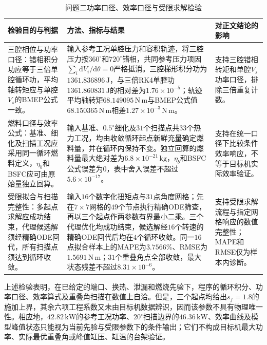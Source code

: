 \documentclass[withoutpreface,bwprint]{cumcmthesis}
\begin{document}
\begin{table}[H]
\centering
\small
\caption{问题二功率口径、效率口径与受限求解检验}
\label{tab:q2-consistency-verification}
\begin{tabular}{p{}p{}p{}}
\toprule
检验目的与判据 & 方法、指标与结果 & 对正文结论的影响\\
\midrule
三腔相位与功率口径：错相积分功应等于三倍单腔循环功，平均轴转矩应与单腔$V_s$的BMEP公式一致。 & 输入参考工况单腔压力和容积轨迹，将三腔压力按$360^\circ$和$720^\circ$错相，共同参考压力项因$\sum_i\mathrm dV_i/\mathrm d\theta=0$严格抵消。三腔梯形积分功为$1361.836896\,\mathrm{J}$，与三倍RK4单腔功$1361.860831\,\mathrm{J}$的相对差为$1.76\times10^{-5}$；轨迹平均轴转矩$68.149095\,\mathrm{N\,m}$与BMEP公式值$68.150365\,\mathrm{N\,m}$相差$1.27\times10^{-3}\,\mathrm{N\,m}$。 & 支持三腔错相转矩和单腔$V_s$功率口径，排除三倍重复计数。\\
燃料口径与效率公式：基准、细化及扫描工况应采用同一循环燃料定义，$\eta_b$和BSFC应可由原始量独立回算。 & 输入基准、$0.5^\circ$细化及$31$个扫描点共$33$个热力工况，均由收敛循环起点新鲜充量确定燃料量，并在循环内保持不变。独立回算的燃料量最大绝对差为$6.8\times10^{-21}\,\mathrm{kg}$，$\eta_b$和BSFC公式误差为$0$，表中舍入误差不超过$5.6\times10^{-17}$。 & 支持在统一口径下比较条件效率响应，不等于目标机实际效率验证。\\
受限拟合与扫描完整性：多起点求解应成功结束，代理候选解须经精确ODE回代，所有扫描点须达到循环收敛。 & 输入$16$个数字化扭矩点与$31$点角度网格；先在$7\times7$网格的$49$个节点执行精确ODE筛查，再以三个起点作两参数有界最小二乘。三个代理优化均成功结束，候选解经$16$个转速的精确ODE回代后均在$4$个循环收敛。同一$16$点拟合样本上的MAPE为$3.7566\%$、RMSE为$1.5691\,\mathrm{N\,m}$；$31$个重叠角点全部收敛，最大状态残差不超过$8.31\times10^{-6}$。 & 支持受限求解流程与指定网格响应的数值完整性；MAPE和RMSE仅为样本内诊断。\\
\bottomrule
\end{tabular}
\end{table}

上述检验表明，在已给定的端口、换热、泄漏和燃烧先验下，程序的循环积分、功率口径、效率算式及重叠角扫描在数值上自洽。但是，三个起点均给出$s_f=1.8$的施加上界，其余六项工程系数又未由目标机数据辨识，因而该参数不具有物理唯一性。相应地，$42.82\,\mathrm{kW}$的参考工况功率、$20^\circ$扫描边界的$46.36\,\mathrm{kW}$、效率曲线及模型峰值状态只能视为当前先验与受限参数下的条件输出；它们不构成目标机最大功率、实际最优重叠角或峰值缸压、缸温的台架验证。
\end{document}
